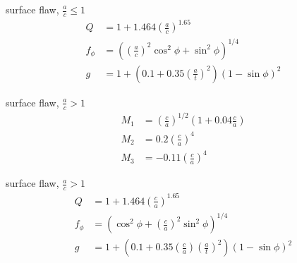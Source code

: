 \documentclass[
  letterpaper,
  ignorenonframetext,
  aspectratio=43,
  handout,
  12pt]{beamer}
\begin{document}
\begin{frame}{surface flaw, \(\frac{a}{c} \le 1\)}
\protect\hypertarget{surface-flaw-fracac-le-1-1}{}
\[\begin{aligned}
  Q &= 1 + 1.464\left(\frac{a}{c}\right)^{1.65}\\
  f_\phi &= \left(\left(\frac{a}{c}\right)^2 \cos^2 \phi + \sin^2 \phi \right)^{1/4}\\
  g &= 1 + \left(0.1 + 0.35 \left(\frac{a}{t}\right)^2\right)\left(1-\sin \phi\right)^2
\end{aligned}\]
\end{frame}

\begin{frame}{surface flaw, \(\frac{a}{c} > 1\)}
\protect\hypertarget{surface-flaw-fracac-1}{}
\[\begin{aligned}
  M_1 &= \left(\frac{c}{a}\right)^{1/2} \left(1 + 0.04 \frac{c}{a}\right)\\
  M_2 &= 0.2 \left(\frac{c}{a}\right)^4\\
  M_3 &= -0.11 \left(\frac{c}{a}\right)^4
\end{aligned}\]
\end{frame}

\begin{frame}{surface flaw, \(\frac{a}{c} > 1\)}
\protect\hypertarget{surface-flaw-fracac-1-1}{}
\[\begin{aligned}
  Q &= 1 + 1.464\left(\frac{c}{a}\right)^{1.65}\\
  f_\phi &= \left(\cos^2 \phi + \left(\frac{c}{a}\right)^2 \sin^2 \phi \right)^{1/4}\\
  g &= 1 + \left(0.1 + 0.35 \left(\frac{c}{a}\right)\left(\frac{a}{t}\right)^2\right)\left(1-\sin \phi\right)^2
\end{aligned}\]
\end{frame}
\end{document}
